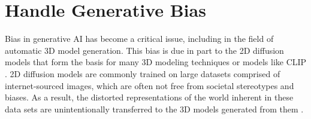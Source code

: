 \section{Handle Generative Bias}

Bias in generative AI has become a critical issue, including in the field of automatic 3D model generation. This bias is due in part to the 2D diffusion models that form the basis for many 3D modeling techniques or models like CLIP \citep{luccioni2023stable,radfordCLIP}. 2D diffusion models are commonly trained on large datasets comprised of internet-sourced images, which are often not free from societal stereotypes and biases. As a result, the distorted representations of the world inherent in these data sets are unintentionally transferred to the 3D models generated from them \citep{buolamwini2018gender}.

